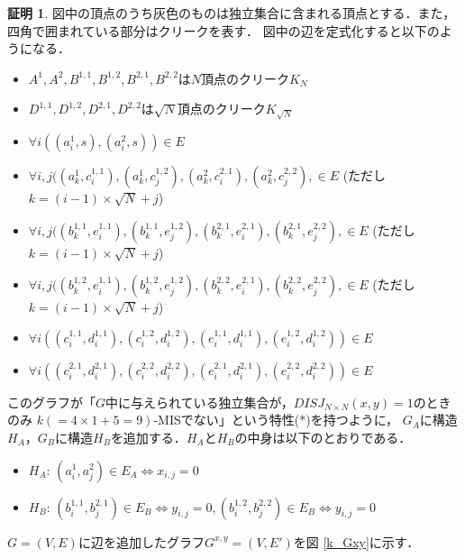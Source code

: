 \documentclass[12pt]{thesis}
\theoremstyle{definition}
\newtheorem*{prf*}{証明}
\begin{document}
\begin{prf*}
図中の頂点のうち灰色のものは独立集合に含まれる頂点とする．また，四角で囲まれている部分はクリークを表す．
図中の辺を定式化すると以下のようになる．
\begin{itemize}
\item $A^{1}, A^{2}, B^{1, 1}, B^{1, 2}, B^{2, 1}, B^{2, 2}$は$N$頂点のクリーク$K_{N}$
\item $D^{1, 1}, D^{1, 2}, D^{2, 1}, D^{2, 2}$は$\sqrt{N}$頂点のクリーク$K_{\sqrt{N}}$
\item $\forall i((a_{i}^{1}, s), (a_{i}^{2}, s)) \in E$
\item $\forall i, j((a_{k}^{1}, c_{i}^{1, 1}), (a_{k}^{1}, c_{j}^{1, 2}), (a_{k}^{2}, c_{i}^{2, 1}), (a_{k}^{2}, c_{j}^{2, 2}), \in E$
(ただし$k = (i - 1) \times \sqrt{N} + j$)
\item $\forall i, j((b_{k}^{1, 1}, e_{i}^{1, 1}), (b_{k}^{1, 1}, e_{j}^{1, 2}), (b_{k}^{2, 1}, e_{i}^{2, 1}), (b_{k}^{2, 1}, e_{j}^{2, 2}), \in E$
(ただし$k = (i - 1) \times \sqrt{N} + j$)
\item $\forall i, j((b_{k}^{1, 2}, e_{i}^{1, 1}), (b_{k}^{1, 2}, e_{j}^{1, 2}), (b_{k}^{2, 2}, e_{i}^{2, 1}), (b_{k}^{2, 2}, e_{j}^{2, 2}), \in E$
(ただし$k = (i - 1) \times \sqrt{N} + j$)
\item $\forall i((c_{i}^{1, 1}, d_{i}^{1, 1}), (c_{i}^{1, 2}, d_{i}^{1, 2}), (e_{i}^{1, 1}, d_{i}^{1, 1}), (e_{i}^{1, 2}, d_{i}^{1, 2})) \in E$
\item $\forall i((c_{i}^{2, 1}, d_{i}^{2, 1}), (c_{i}^{2, 2}, d_{i}^{2, 2}), (e_{i}^{2, 1}, d_{i}^{2, 1}), (e_{i}^{2, 2}, d_{i}^{2, 2})) \in E$
\end{itemize}

このグラフが「$G$中に与えられている独立集合が，$DISJ_{N \times N} (x, y) = 1$のときのみ
$k( = 4 \times 1 + 5 = 9)$-MISでない」という特性(*)を持つように，
$G_{A}$に構造$H_{A}$，$G_{B}$に構造$H_{B}$を追加する．$H_{A}$と$H_{B}$の中身は以下のとおりである．

\begin{itemize}
\item $H_{A}$: $(a_{i}^{1}, a_{j}^{2}) \in E_{A} \Leftrightarrow x_{i, j} = 0$
\item $H_{B}$: $(b_{i}^{1,1}, b_{j}^{2,1}) \in E_{B} \Leftrightarrow y_{i, j} = 0, (b_{i}^{1,2}, b_{j}^{2,2}) \in E_{B} \Leftrightarrow y_{i, j} = 0$
\end{itemize}

$G = (V, E)$に辺を追加したグラフ$G^{x, y} = (V, E')$を図 \ref{k_Gxy}に示す．


\end{prf*}
\end{document}
